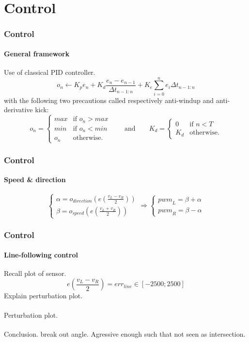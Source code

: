 \documentclass{beamer}
\begin{document}
\section{Control} 

\begin{frame}
\frametitle{Control}
\framesubtitle{General framework}
Use of classical PID controller.
$$ 
o_n \leftarrow K_p e_n + K_d\frac{e_n - e_{n-1}}{\Delta t_{n-1:n}} + K_e\sum_{i=0}^{n}{e_i \Delta t_{n-1:n}}
$$
with the following two precautions called respectively anti-windup and anti-derivative kick:
$$
o_n = \left\{
    \begin{array}{ll}
        max & \mbox{if } o_n > max \\
        min & \mbox{if } o_n < min \\
        o_n & \mbox{otherwise.}
    \end{array}
\right.
\qquad\text{and}\qquad	
K_d = \left\{
    \begin{array}{ll}
        0 & \mbox{if } n < T \\
       K_d & \mbox{otherwise.}
    \end{array}
\right.
$$
\end{frame}


\begin{frame}
\frametitle{Control}
\framesubtitle{Speed \& direction}
$$ 
\left\{
    \begin{array}{ll}
		\alpha = o_{direction}(e(\frac{v_L - v_R}{2})) \\[0.3cm]
		\beta = o_{speed}(e(\frac{v_L + v_R}{2}))
	\end{array}
\right.
\Rightarrow
\left\{
    \begin{array}{ll}
		{pwm}_L =  \beta + \alpha \\
		{pwm}_R = \beta - \alpha
	\end{array}
\right.
$$
\end{frame}


\begin{frame}
\frametitle{Control}
\framesubtitle{Line-following control}
Recall plot of sensor. 
$$ 
e(\frac{v_L - v_R}{2})=err_{line} \in [-2500;2500]
$$
Explain perturbation plot.\\~\\
Perturbation plot.\\~\\
Conclusion. break out angle. Agressive enough such that not seen as intersection.
\end{frame}
\end{document}
